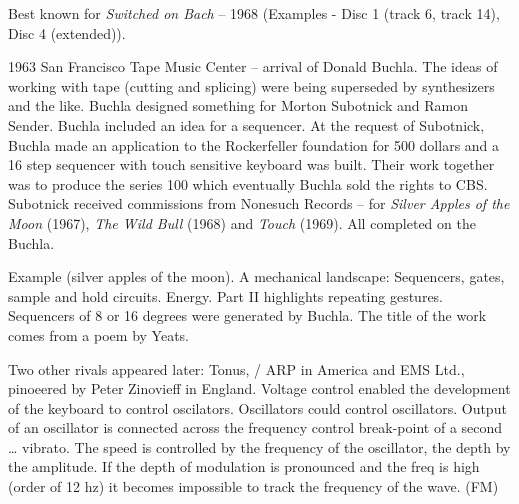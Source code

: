 Best known for \textit{Switched on Bach} – 1968 (Examples - Disc 1 (track 6, track 14), Disc 4 (extended)).

1963 San Francisco Tape Music Center – arrival of Donald Buchla. The ideas of working with tape (cutting and splicing) were being superseded by synthesizers and the like. Buchla designed something for Morton Subotnick and Ramon Sender. Buchla included an idea for a sequencer. At the request of Subotnick, Buchla made an application to the Rockerfeller foundation for 500 dollars and a 16 step sequencer with touch sensitive keyboard was built. Their work together was to produce the series 100 which eventually Buchla sold the rights to CBS. Subotnick received commissions from Nonesuch Records – for \textit{Silver Apples of the Moon} (1967), \textit{The Wild Bull} (1968) and \textit{Touch} (1969). All completed on the Buchla.

Example (silver apples of the moon). A mechanical landscape: Sequencers, gates, sample and hold circuits. Energy. Part II highlights repeating gestures. Sequencers of 8 or 16 degrees were generated by Buchla. The title of the work comes from a poem by Yeats.

Two other rivals appeared later: Tonus, / ARP in America and EMS Ltd., pinoeered by Peter Zinovieff in England. Voltage control enabled the development of the keyboard to control oscilators. Oscillators could control oscillators. Output of an oscillator is connected across the frequency control break-point of a second … vibrato. The speed is controlled by the frequency of the oscillator, the depth by the amplitude. If the depth of modulation is pronounced and the freq is high (order of 12 hz) it becomes impossible to track the frequency of the wave. (FM)

